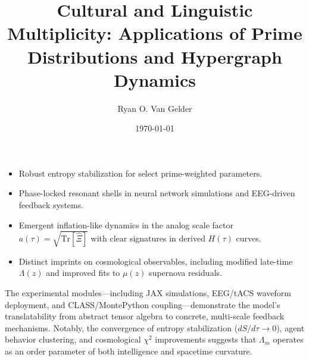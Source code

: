\documentclass{article}
\theoremstyle{plain}
\theoremstyle{claimstyle}
\begin{document}
\begin{itemize}
  \item Robust entropy stabilization for select prime-weighted parameters.
  \item Phase-locked resonant shells in neural network simulations and EEG-driven feedback systems.
  \item Emergent inflation-like dynamics in the analog scale factor $a(\tau) = \sqrt{\text{Tr}[\hat{\Xi}]}$ with clear signatures in derived $H(\tau)$ curves.
  \item Distinct imprints on cosmological observables, including modified late-time $\Lambda(z)$ and improved fits to $\mu(z)$ supernova residuals.
\end{itemize}

The experimental modules—including JAX simulations, EEG/tACS waveform deployment, and CLASS/MontePython coupling—demonstrate the model’s translatability from abstract tensor algebra to concrete, multi-scale feedback mechanisms. Notably, the convergence of entropy stabilization ($dS/d\tau \to 0$), agent behavior clustering, and cosmological $\chi^2$ improvements suggests that $\Lambda_m$ operates as an order parameter of both intelligence and spacetime curvature.

\newpage
\title{Cultural and Linguistic Multiplicity: Applications of Prime Distributions and Hypergraph Dynamics}

\author{Ryan O. Van Gelder}
\date{\today}
\maketitle
\end{document}
